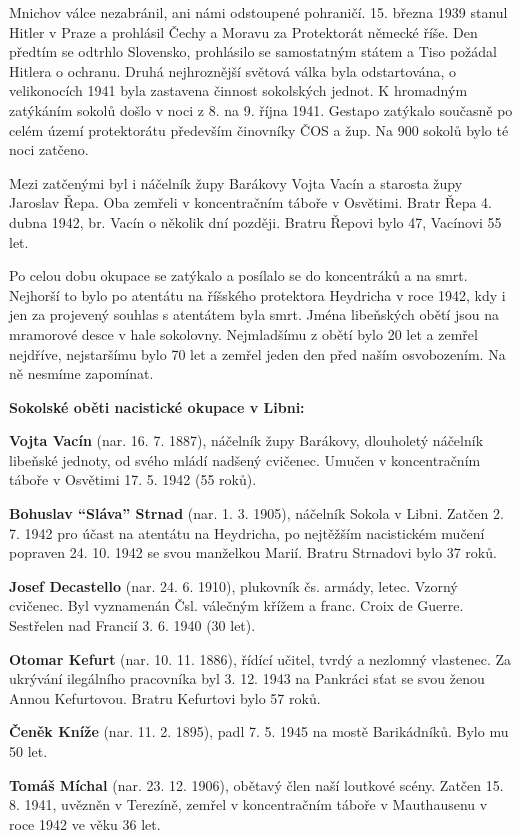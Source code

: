 Mnichov válce nezabránil, ani námi odstoupené pohraničí. 15. března 1939
stanul Hitler v Praze a prohlásil Čechy a Moravu za Protektorát německé
říše. Den předtím se odtrhlo Slovensko, prohlásilo se samostatným státem
a Tiso požádal Hitlera o ochranu. Druhá nejhroznější světová válka byla
odstartována, o velikonocích 1941 byla zastavena činnost sokolských
jednot. K hromadným zatýkáním sokolů došlo v noci z 8. na 9. října 1941.
Gestapo zatýkalo současně po celém území protektorátu především
činovníky ČOS a žup. Na 900 sokolů bylo té noci zatčeno.

Mezi zatčenými byl i náčelník župy Barákovy Vojta Vacín a starosta župy
Jaroslav Řepa. Oba zemřeli v koncentračním táboře v Osvětimi. Bratr Řepa
4. dubna 1942, br. Vacín o několik dní později. Bratru Řepovi bylo 47,
Vacínovi 55 let.

Po celou dobu okupace se zatýkalo a posílalo se do koncentráků a na
smrt. Nejhorší to bylo po atentátu na říšského protektora Heydricha v
roce 1942, kdy i jen za projevený souhlas s atentátem byla smrt. Jména
libeňských obětí jsou na mramorové desce v hale sokolovny. Nejmladšímu z
obětí bylo 20 let a zemřel nejdříve, nejstaršímu bylo 70 let a zemřel
jeden den před naším osvobozením. Na ně nesmíme zapomínat.

\textbf{Sokolské oběti nacistické okupace v Libni:}

\textbf{Vojta Vacín} (nar. 16. 7. 1887), náčelník župy Barákovy,
dlouholetý náčelník libeňské jednoty, od svého mládí nadšený cvičenec.
Umučen v koncentračním táboře v Osvětimi 17. 5. 1942 (55 roků).

\textbf{Bohuslav ``Sláva'' Strnad} (nar. 1. 3. 1905), náčelník Sokola v
Libni. Zatčen 2. 7. 1942 pro účast na atentátu na Heydricha, po
nejtěžším nacistickém mučení popraven 24. 10. 1942 se svou manželkou
Marií. Bratru Strnadovi bylo 37 roků.

\textbf{Josef Decastello} (nar. 24. 6. 1910), plukovník čs. armády,
letec. Vzorný cvičenec. Byl vyznamenán Čsl. válečným křížem a franc.
Croix de Guerre. Sestřelen nad Francií 3. 6. 1940 (30 let).

\textbf{Otomar Kefurt} (nar. 10. 11. 1886), řídící učitel, tvrdý a
nezlomný vlastenec. Za ukrývání ilegálního pracovníka byl 3. 12. 1943 na
Pankráci sťat se svou ženou Annou Kefurtovou. Bratru Kefurtovi bylo 57
roků.

\textbf{Čeněk Kníže} (nar. 11. 2. 1895), padl 7. 5. 1945 na mostě
Barikádníků. Bylo mu 50 let.

\textbf{Tomáš Míchal} (nar. 23. 12. 1906), obětavý člen naší loutkové
scény. Zatčen 15. 8. 1941, uvězněn v Terezíně, zemřel v koncentračním
táboře v Mauthausenu v roce 1942 ve věku 36 let.

